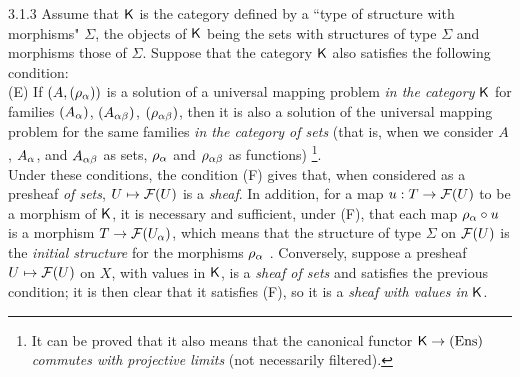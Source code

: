\documentclass[../main.tex]{subfiles}
\begin{document}
\begin{env}{3.1.3}
Assume that $\mathsf{K}$ is the category defined by a ``type of structure
with morphisms" $\Sigma$, the objects of $\mathsf{K}$ being the sets with structures
of type $\Sigma$ and morphisms those of $\Sigma$. Suppose that the category $\mathsf{K}$ also satisfies
the following condition:\\

(E) If $(A,(\rho_\alpha))$ is a solution of a universal mapping problem \emph{in the category} $\mathsf{K}$
for families $(A_\alpha)$, $(A_{\alpha\beta})$, $(\rho_{\alpha\beta})$, then it is also a solution of the
universal mapping problem for the same families \emph{in the category of sets} (that is, when we
consider $A$, $A_\alpha$, and $A_{\alpha\beta}$ as sets, $\rho_\alpha$ and $\rho_{\alpha\beta}$ as functions)
\footnote{It can be proved that it also means that the canonical functor $\mathsf{K}\to(\mathrm{Ens})$
\emph{commutes with projective limits} (not necessarily filtered).}.\\

Under these conditions, the condition (F) gives that, when considered as a presheaf
\emph{of sets}, $U\mapsto\mathcal{F}(U)$ is a \emph{sheaf}. In addition, for a map $u:T\to\mathcal{F}(U)$
to be a morphism of $\mathsf{K}$, it is necessary and sufficient, under (F), that each map $\rho_\alpha\circ u$
is a morphism $T\to\mathcal{F}(U_\alpha)$, which means that the structure of type $\Sigma$ on $\mathcal{F}(U)$
is the \emph{initial structure} for the morphisms $\rho_\alpha$ . Conversely, suppose a presheaf
$U\mapsto\mathcal{F}(U)$ on $X$, with values in $\mathsf{K}$, is a \emph{sheaf of sets} and satisfies the previous
condition; it is then clear that it satisfies (F), so it is a \emph{sheaf with values in} $\mathsf{K}$.
\end{env}
\end{document}
